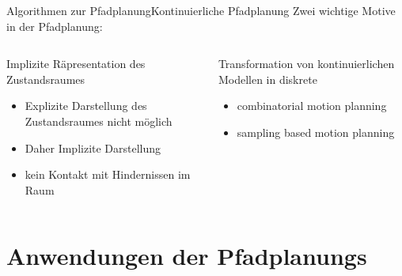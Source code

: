 \documentclass[t,aspectratio=169,dvipsnames]{beamer}
\begin{document}
\begin{frame}{Algorithmen zur Pfadplanung}{Kontinuierliche Pfadplanung}
	Zwei wichtige Motive in der Pfadplanung:\\
	\begin{columns}
		\begin{column}[T]{0.5\textwidth}
			\begin{block}{Implizite Räpresentation des Zustandsraumes}
			\begin{itemize}
				\item Explizite Darstellung des Zustandsraumes nicht möglich
				\item Daher Implizite Darstellung
				\item kein Kontakt mit Hindernissen im Raum
			\end{itemize}
			\end{block}
		\end{column}
		\begin{column}[T]{0.5\textwidth}
			\begin{block}{Transformation von kontinuierlichen Modellen in diskrete}
			\begin{itemize}
				\item combinatorial motion planning
				\item sampling based motion planning
			\end{itemize}
			\end{block}
		\end{column}
	\end{columns}
\end{frame}

\section{Anwendungen der Pfadplanungs}
\end{document}
